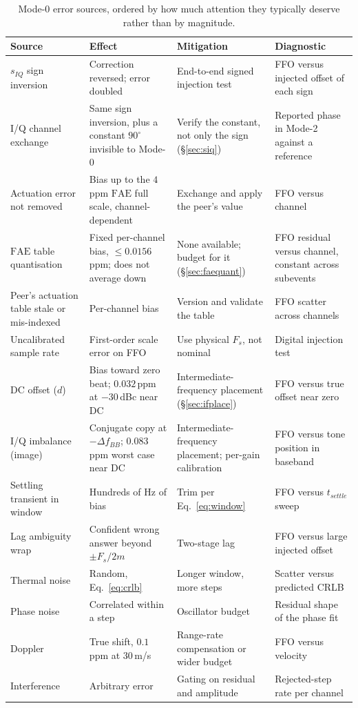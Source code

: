 \documentclass[11pt,a4paper]{article}
\newcommand{\FAE}{\mathrm{FAE}}
\begin{document}
\begin{table}[h]
\caption{Mode-0 error sources, ordered by how much attention they typically deserve rather than by
magnitude.}
\label{tab:errors}
\centering\small
\begin{tabular}{@{}L{30mm}L{34mm}L{34mm}L{30mm}@{}}
\toprule
Source & Effect & Mitigation & Diagnostic \\
\midrule
$s_{IQ}$ sign inversion & Correction reversed; error doubled & End-to-end signed injection test & FFO versus injected offset of each sign \\
I/Q channel exchange & Same sign inversion, plus a constant $90^{\circ}$ invisible to Mode-0 & Verify the constant, not only the sign (\S\ref{sec:siq}) & Reported phase in Mode-2 against a reference \\
Actuation error not removed & Bias up to the $4$\,ppm $\FAE$ full scale, channel-dependent & Exchange and apply the peer's value & FFO versus channel \\
$\FAE$ table quantisation & Fixed per-channel bias, $\le 0.0156$\,ppm; does not average down & None available; budget for it (\S\ref{sec:faequant}) & FFO residual versus channel, constant across subevents \\
Peer's actuation table stale or mis-indexed & Per-channel bias & Version and validate the table & FFO scatter across channels \\
Uncalibrated sample rate & First-order scale error on FFO & Use physical $F_s$, not nominal & Digital injection test \\
DC offset ($d$) & Bias toward zero beat; $0.032$\,ppm at $-30$\,dBc near DC & Intermediate-frequency placement (\S\ref{sec:ifplace}) & FFO versus true offset near zero \\
I/Q imbalance (image) & Conjugate copy at $-\Delta f_{BB}$; $0.083$\,ppm worst case near DC & Intermediate-frequency placement; per-gain calibration & FFO versus tone position in baseband \\
Settling transient in window & Hundreds of Hz of bias & Trim per Eq.~\eqref{eq:window} & FFO versus $t_{settle}$ sweep \\
Lag ambiguity wrap & Confident wrong answer beyond $\pm F_s/2m$ & Two-stage lag & FFO versus large injected offset \\
Thermal noise & Random, Eq.~\eqref{eq:crlb} & Longer window, more steps & Scatter versus predicted CRLB \\
Phase noise & Correlated within a step & Oscillator budget & Residual shape of the phase fit \\
Doppler & True shift, $0.1$\,ppm at 30\,m/s & Range-rate compensation or wider budget & FFO versus velocity \\
Interference & Arbitrary error & Gating on residual and amplitude & Rejected-step rate per channel \\
\bottomrule
\end{tabular}
\end{table}
\end{document}
